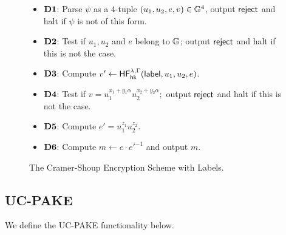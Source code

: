\begin{figure}[tbp]
\begin{framed}
		\begin{itemize}
			\itemsep=0em
			\item[]\textbf{$\mathbf{D1}$}: Parse $\psi$ as a $4$-tuple $(u_1,u_2,e,v)\in\mathbb{G}^4$, output $\mathsf{reject}$ and halt if $\psi$ is not of this form.
			\item[]\textbf{$\mathbf{D2}$}: Test if $u_1, u_2$ and $e$ belong to $\mathbb{G}$; output $\mathsf{reject}$ and halt if this is not the case.
			\item[]\textbf{$\mathbf{D3}$}: Compute $v'\gets\mathsf{HF}^{\lambda,\Gamma}_{\mathsf{hk}}(\mathsf{label},u_1,u_2,e)$.
			\item[]\textbf{$\mathbf{D4}$}: Test if $v = u_1^{x_1+y_1\alpha}u_2^{x_2+y_2\alpha};$ output $\mathsf{reject}$ and halt if this is not the case.
			\item[]\textbf{$\mathbf{D5}$}: Compute $e' = u_1^{z_1}u_2^{z_2}$.
			\item[]\textbf{$\mathbf{D6}$}: Compute $m\gets e\cdot {e'}^{-1}$ and output $m$.
		\end{itemize}
	\end{framed}
	\caption{The Cramer-Shoup Encryption Scheme with Labels.}
	\label{fig:cs03}
	\end{figure}

	\subsection{UC-PAKE}
	
	We define the UC-PAKE functionality below.
	
